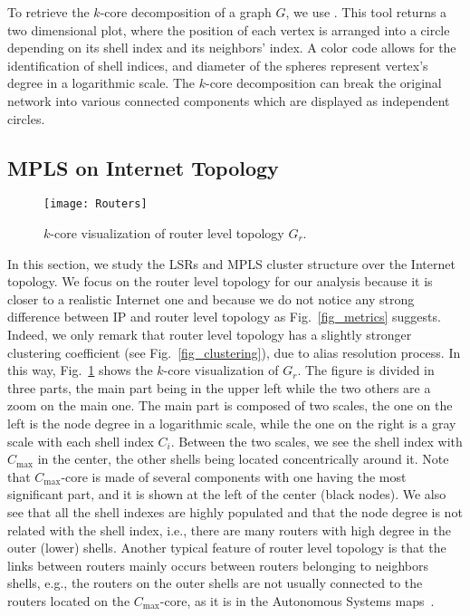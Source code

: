 To retrieve the $k$-core decomposition of a graph $G$, we use
\lanet\cite{Alvarez06k}. This tool returns a two dimensional plot, where the
position of each vertex is arranged into a circle depending on its shell index
and its neighbors' index. A color code allows for the identification of shell
indices, and diameter of the spheres represent vertex's degree in a logarithmic
scale. The $k$-core decomposition can break the original network into various
connected components which are displayed as independent circles.

\subsection{MPLS on Internet Topology}\label{cluster.topo}
\begin{figure}[!t]
  \begin{center}
    \texttt{[image: Routers]}
  \end{center}
\vspace{-0.5cm}
  \caption{$k$-core visualization of router level topology $G_{r}$.}
  \label{fig_k_core_routers}
\end{figure}

In this section, we study the LSRs and MPLS cluster structure over the Internet
topology.  We focus on the router level topology for our analysis because
it is closer to a realistic Internet one and because we do not notice any strong
difference between IP and router level topology as Fig.~\ref{fig_metrics}
suggests. Indeed, we only remark that router level topology has a slightly
stronger clustering coefficient (see Fig.~\ref{fig_clustering}), due to alias
resolution process. In this way, Fig.~\ref{fig_k_core_routers} shows the
$k$-core visualization of $G_{r}$.  The figure is divided in three parts, the
main part being in the upper left while the two others are a zoom on the main
one.  The main part is composed of two scales, the one on the left is the node
degree in a logarithmic scale, while the one on the right is a gray scale with
each shell index $C_i$. Between the two scales, we see the shell index with
$C_{\max}$ in the center, the other shells being located concentrically around
it. Note that $C_{\max}$-core is made of several components with one having the
most significant part, and it is shown at the left of the center (black nodes).
We also see that all the shell indexes are highly populated and that the node
degree is not related with the shell index, i.e., there are many routers with
high degree in the outer (lower) shells. Another typical feature of router level
topology is that the links between routers mainly occurs between routers
belonging to neighbors shells, e.g., the routers on the outer shells are not
usually connected to the routers located on the  $C_{\max}$-core, as it is in
the Autonomous Systems maps~\cite{Alvarez06k}.

